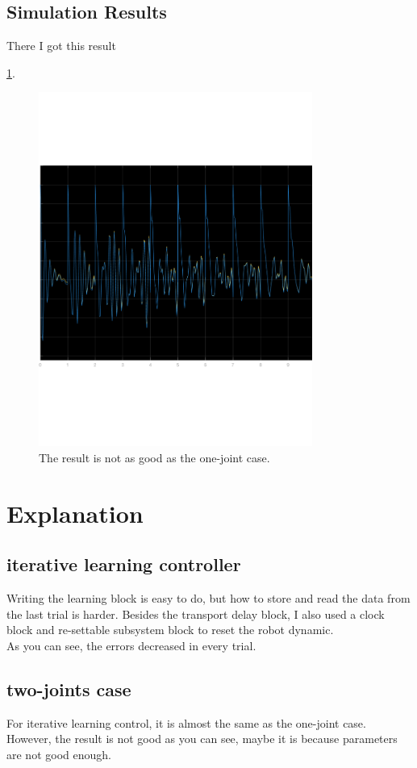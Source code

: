 \documentclass{article}
\begin{document}
\subsection{Simulation Results}

There I got this result

\ref{fig:result_ilc_muilt_joints}. \\
\begin{figure}[ht]
    \centering
    \includegraphics[width=0.8\textwidth]{report/figures/result_ilc_muilt_joints.pdf}
    \caption{The result is not as good as the one-joint case.}
    \label{fig:result_ilc_muilt_joints}
\end{figure}



\newpage

\section{Explanation}



\subsection{iterative learning controller}
Writing the learning block is easy to do, but how to store and read the data from the last trial is harder. Besides the transport delay block, I also used a clock block and re-settable subsystem block to reset the robot dynamic.\\

As you can see, the errors decreased in every trial.
\subsection{two-joints case}
For iterative learning control, it is almost the same as the one-joint case.\\

However, the result is not good as you can see, maybe it is because parameters are not good enough.\\
\end{document}
